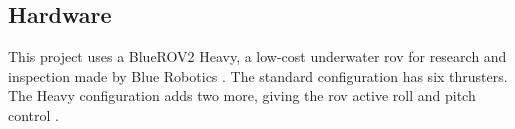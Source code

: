 %
%
%


\subsection{Hardware}
\label{sec:ch4.hardware}
 
This project uses a BlueROV2 Heavy, a low-cost underwater \gls{rov} for research and inspection made by Blue Robotics
\cite{bluerobBlueROV2}. The standard configuration has six thrusters. The Heavy configuration adds two more,
giving the \gls{rov} active roll and pitch control  \cite{bluerobBlueROV2Heavy}.
 
